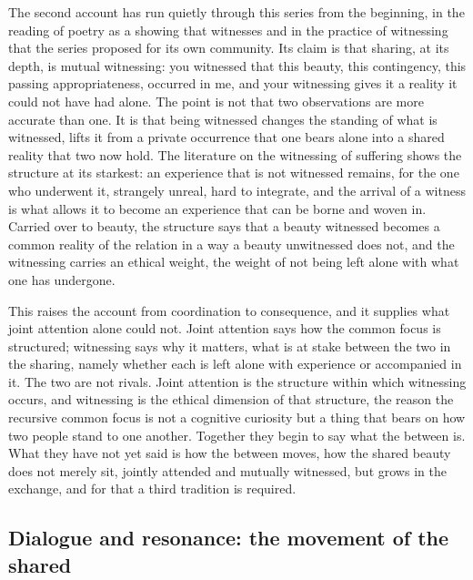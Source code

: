 The second account has run quietly through this series from the beginning, in the reading of poetry as a showing that witnesses and in the practice of witnessing that the series proposed for its own community. Its claim is that sharing, at its depth, is mutual witnessing: you witnessed that this beauty, this contingency, this passing appropriateness, occurred in me, and your witnessing gives it a reality it could not have had alone. The point is not that two observations are more accurate than one. It is that being witnessed changes the standing of what is witnessed, lifts it from a private occurrence that one bears alone into a shared reality that two now hold. The literature on the witnessing of suffering shows the structure at its starkest: an experience that is not witnessed remains, for the one who underwent it, strangely unreal, hard to integrate, and the arrival of a witness is what allows it to become an experience that can be borne and woven in. Carried over to beauty, the structure says that a beauty witnessed becomes a common reality of the relation in a way a beauty unwitnessed does not, and the witnessing carries an ethical weight, the weight of not being left alone with what one has undergone.

This raises the account from coordination to consequence, and it supplies what joint attention alone could not. Joint attention says how the common focus is structured; witnessing says why it matters, what is at stake between the two in the sharing, namely whether each is left alone with experience or accompanied in it. The two are not rivals. Joint attention is the structure within which witnessing occurs, and witnessing is the ethical dimension of that structure, the reason the recursive common focus is not a cognitive curiosity but a thing that bears on how two people stand to one another. Together they begin to say what the between is. What they have not yet said is how the between moves, how the shared beauty does not merely sit, jointly attended and mutually witnessed, but grows in the exchange, and for that a third tradition is required.

\subsection{Dialogue and resonance: the movement of the shared}
\label{p22:sub:sharing-dialogue}


